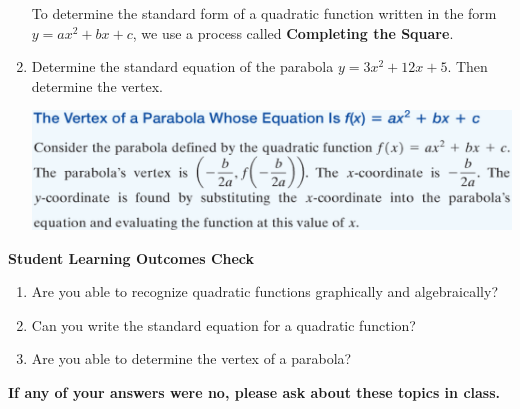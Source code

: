 \documentclass[11pt]{article}
\begin{document}
\begin{enumerate}
\noindent To determine the standard form of a quadratic function written in the form $y=ax^2+bx+c$, we use a process called \textbf{Completing the Square}.


 
 \item Determine the standard equation of the parabola $y=3x^2+12x+5$.  Then determine the vertex.
 
 
 \vfill
 
  
 \includegraphics[scale=.75]{parabola}






\end{enumerate}

\noindent \textbf{Student Learning Outcomes Check}

\begin{enumerate}
\item Are you able to recognize quadratic functions graphically and algebraically?
\item Can you write the standard equation for a quadratic function?
\item Are you able to determine the vertex of a parabola?


\end{enumerate}

\noindent \textbf{If any of your answers were no, please ask about these topics in class.}
\end{document}
